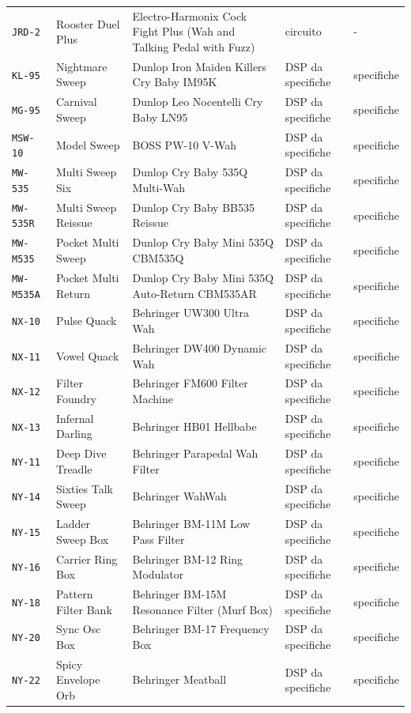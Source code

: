 \begin{xltabular}{\linewidth}{@{}l l X l l@{}}
\texttt{JRD-2} & Rooster Duel Plus & Electro-Harmonix Cock Fight Plus (Wah and Talking Pedal with Fuzz) & circuito & -\\
\texttt{KL-95} & Nightmare Sweep & Dunlop Iron Maiden Killers Cry Baby IM95K & DSP da specifiche & specifiche\\
\texttt{MG-95} & Carnival Sweep & Dunlop Leo Nocentelli Cry Baby LN95 & DSP da specifiche & specifiche\\
\texttt{MSW-10} & Model Sweep & BOSS PW-10 V-Wah & DSP da specifiche & specifiche\\
\texttt{MW-535} & Multi Sweep Six & Dunlop Cry Baby 535Q Multi-Wah & DSP da specifiche & specifiche\\
\texttt{MW-535R} & Multi Sweep Reissue & Dunlop Cry Baby BB535 Reissue & DSP da specifiche & specifiche\\
\texttt{MW-M535} & Pocket Multi Sweep & Dunlop Cry Baby Mini 535Q CBM535Q & DSP da specifiche & specifiche\\
\texttt{MW-M535A} & Pocket Multi Return & Dunlop Cry Baby Mini 535Q Auto-Return CBM535AR & DSP da specifiche & specifiche\\
\texttt{NX-10} & Pulse Quack & Behringer UW300 Ultra Wah & DSP da specifiche & specifiche\\
\texttt{NX-11} & Vowel Quack & Behringer DW400 Dynamic Wah & DSP da specifiche & specifiche\\
\texttt{NX-12} & Filter Foundry & Behringer FM600 Filter Machine & DSP da specifiche & specifiche\\
\texttt{NX-13} & Infernal Darling & Behringer HB01 Hellbabe & DSP da specifiche & specifiche\\
\texttt{NY-11} & Deep Dive Treadle & Behringer Parapedal Wah Filter & DSP da specifiche & specifiche\\
\texttt{NY-14} & Sixties Talk Sweep & Behringer WahWah & DSP da specifiche & specifiche\\
\texttt{NY-15} & Ladder Sweep Box & Behringer BM-11M Low Pass Filter & DSP da specifiche & specifiche\\
\texttt{NY-16} & Carrier Ring Box & Behringer BM-12 Ring Modulator & DSP da specifiche & specifiche\\
\texttt{NY-18} & Pattern Filter Bank & Behringer BM-15M Resonance Filter (Murf Box) & DSP da specifiche & specifiche\\
\texttt{NY-20} & Sync Osc Box & Behringer BM-17 Frequency Box & DSP da specifiche & specifiche\\
\texttt{NY-22} & Spicy Envelope Orb & Behringer Meatball & DSP da specifiche & specifiche\\

\end{xltabular}
